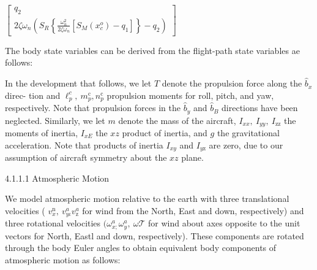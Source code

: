 $\left[ \begin{array}{c} q_2 \\ 2\zeta\omega_n \left( S_R \left\lbrace \frac{\omega^2_n}{2\zeta\omega_n} \left[ S_M(x^o_c)-q_1 \right] \right\rbrace -q_2 \right) \end{array} \right]$


The body state variables can be derived from the flight-path state variables ae follows:



In the development that follows, we let $T$ denote the propulsion force along the $\hat{b}_{x}$ direc- tion and $\ell_{p}^{c},\ m_{p}^{\mathrm{c}}, n_{p}^{\mathrm{c}}$ propulsion moments for roll, pitch, and yaw, respectively. Note that propulsion forces in the $\hat{b}_{y}$ and $\hat{b}_{B}$ directions have been neglected. Similarly, we let $m$ denote the mass of the aircraft, $I_{xx},\ I_{yy},\ I_{\mathrm{z}\mathrm{z}}$ the moments of inertia, $I_{xE}$ the $xz$ product of inertia, and $g$ the gravitational acceleration. Note that products of inertia $I_{xy}$ and $I_{y\mathrm{z}}$ are zero, due to our assumption of aircraft symmetry about the $xz$ plane.

4.1.1.1 Atmospheric Motion

We model atmospheric motion relative to the earth with three translational velocities ( $v_{x}^{\mathrm{n}},\ v_{y\iota}^{a}v_{\mathrm{z}}^{a}$ for wind from the North, East and down, respectively) and three rotational velocities $(\omega_{x;}^{a}\omega_{y}^{a},\ \omega \mathcal{T}$ for wind about axes opposite to the unit vectors for North, Eastl and down, respectively). These components are rotated through the body Euler angles to obtain equivalent body components of atmospheric motion as follows:

